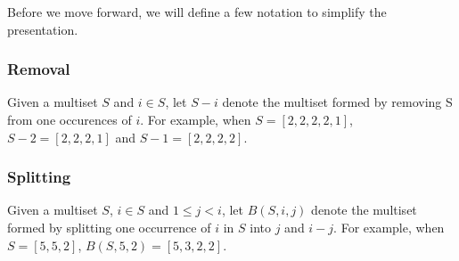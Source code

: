 \documentclass[sigconf,anonymous]{aamas}
\begin{document}
Before we move forward, we will define a few notation to simplify the presentation. 

\subsubsection{Removal}

Given a multiset $S$ and $i\in S$, let $S - i$ denote the multiset formed by removing S from one occurences of $i$. For example, when $S=[2,2,2,2,1] $, $S-2=[2,2,2,1]$ and $S-1=[2,2,2,2]$. 

\subsubsection{Splitting}

Given a multiset $S$, $i \in S$ and $1 \leq j < i$, let $B(S, i, j)$ denote the multiset formed by splitting one occurrence of $i$ in $S$ into $j$ and $i-j$. For example, when $S=[5, 5, 2]$, $B(S, 5, 2)  =  [5, 3, 2, 2]$. 
\end{document}
